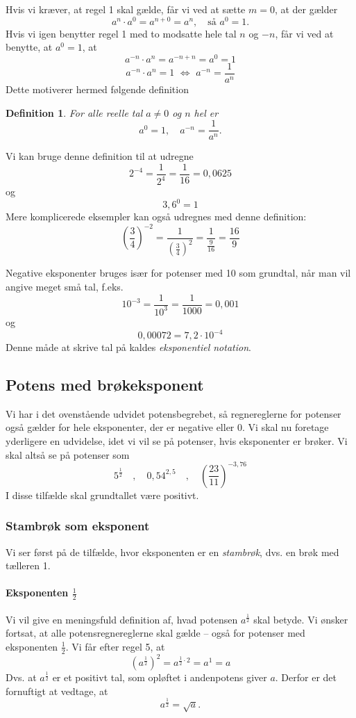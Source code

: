 \documentclass[12pt,oneside,a4paper]{article}
\theoremstyle{plain}
\newtheorem*{mydef}{Definition}
\begin{document}
Hvis vi kræver, at regel 1 skal gælde, får vi ved at sætte $m=0$, at der gælder
$$
a^n \cdot a^0 = a^{n+0} = a^n,\quad \mbox{så $a^0=1$.}
$$
Hvis vi igen benytter regel 1 med to modsatte hele tal $n$ og $-n$, får vi ved
at benytte, at $a^0=1$, at
$$
a^{-n} \cdot a^n = a^{-n+n} = a^0 = 1
$$
$$
a^{-n} \cdot a^n = 1 \,\,\Leftrightarrow \,\,a^{-n} = \frac{1}{a^n}
$$
Dette motiverer hermed følgende definition
\begin{mydef}
    For alle reelle tal $a\neq 0$ og $n$ hel er
    $$
    a^0 = 1,\quad a^{-n} = \frac{1}{a^n}.
    $$
\end{mydef}

Vi kan bruge denne definition til at udregne
$$
2^{-4} = \frac{1}{2^4} = \frac{1}{16} = 0,0625
$$
og
$$
3,6^0 = 1
$$
Mere komplicerede eksempler kan også udregnes med denne definition:
$$
\left(\frac{3}{4}\right)^{-2} = \frac{1}{\left(\frac{3}{4}\right)^2} = \frac{1}{\frac{9}{16}} = \frac{16}{9}
$$

Negative eksponenter bruges især for potenser med 10 som grundtal, når man vil angive meget små tal, f.eks.
$$
10^{-3} = \frac{1}{10^3} = \frac{1}{1000} = 0,001
$$
og
$$
0,00072 = 7,2\cdot 10^{-4}
$$
Denne måde at skrive tal på kaldes {\em eksponentiel notation}.


\subsection*{Potens med brøkeksponent}
Vi har i det ovenstående udvidet potensbegrebet, så regnereglerne for potenser også gælder for hele eksponenter, der er negative eller 0. Vi skal nu foretage yderligere en udvidelse, idet vi vil se på potenser, hvis eksponenter er brøker. Vi skal altså se på potenser som
$$
5^{\frac12} \quad,\quad 0,54^{2,5} \quad,\quad
\left(\frac{23}{11}\right)^{-3,76}
$$
I disse tilfælde skal grundtallet være positivt.

\subsubsection*{Stambrøk som eksponent}
Vi ser først på de tilfælde, hvor eksponenten er en {\em stambrøk}, dvs. en brøk
med tælleren 1.

\paragraph*{Eksponenten $\frac12$}
Vi vil give en meningsfuld definition af, hvad potensen $a^{\frac12}$ skal
betyde.  Vi ønsker fortsat, at alle potensregnereglerne skal gælde -- også for
potenser med eksponenten $\frac12$. Vi får efter regel 5, at 
$$
\left(a^{\frac12}\right)^2 = a^{\frac12 \cdot 2} = a^1 = a
$$
Dvs. at $a^\frac12$ er et positivt tal, som opløftet i andenpotens giver $a$.
Derfor er det fornuftigt at vedtage, at
$$
a^\frac12 = \sqrt{a}.
$$
\end{document}
